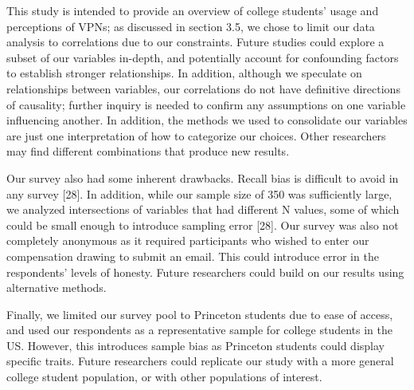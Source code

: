This study is intended to provide an overview of college students’ usage and perceptions of VPNs; as discussed in section 3.5, we chose to limit our data analysis to correlations due to our constraints. Future studies could explore a subset of our variables in-depth, and potentially account for confounding factors to establish stronger relationships. In addition, although we speculate on relationships between variables, our correlations do not have definitive directions of causality; further inquiry is needed to confirm any assumptions on one variable influencing another. In addition, the methods we used to consolidate our variables are just one interpretation of how to categorize our choices. Other researchers may find different combinations that produce new results.

Our survey also had some inherent drawbacks. Recall bias is difficult to avoid in any survey [28]. In addition, while our sample size of 350 was sufficiently large, we analyzed intersections of variables that had different N values, some of which could be small enough to introduce sampling error [28]. Our survey was also not completely anonymous as it required participants who wished to enter our compensation drawing to submit an email. This could introduce error in the respondents’ levels of honesty. Future researchers could build on our results using alternative methods.

Finally, we limited our survey pool to Princeton students due to ease of access, and used our respondents as a representative sample for college students in the US. However, this introduces sample bias as Princeton students could display specific traits. Future researchers could replicate our study with a more general college student population, or with other populations of interest.